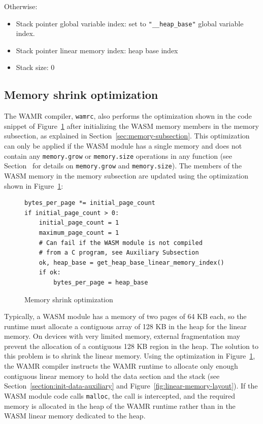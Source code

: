 \documentclass{article}
\begin{document}
Otherwise:

\begin{itemize}
\item Stack pointer global variable index: set to \verb|"__heap_base"| global variable index.
\item Stack pointer linear memory index: heap base index
\item Stack size: 0
\end{itemize}

\subsection{Memory shrink optimization}

The WAMR compiler, \verb|wamrc|, also performs the optimization shown in the code snippet of Figure~\ref{fig:memory-shrink-optimization} after initializing the WASM memory members in the memory subsection, as explained in Section~\ref{sec:memory-subsection}.
This optimization can only be applied if the WASM module has a single memory and does not contain any \verb|memory.grow| or \verb|memory.size| operations in any function (see Section~\cite[Sec.~2.4.4]{webassembly2019core} for details on \verb|memory.grow| and \verb|memory.size|).
The members of the WASM memory in the memory subsection are updated using the optimization shown in Figure~\ref{fig:memory-shrink-optimization}:

\begin{figure}[H]
\begin{verbatim}
bytes_per_page *= initial_page_count
if initial_page_count > 0:
    initial_page_count = 1
    maximum_page_count = 1
    # Can fail if the WASM module is not compiled
    # from a C program, see Auxiliary Subsection
    ok, heap_base = get_heap_base_linear_memory_index()
    if ok:
        bytes_per_page = heap_base
\end{verbatim}
\caption{Memory shrink optimization}
\label{fig:memory-shrink-optimization}
\end{figure}

Typically, a WASM module has a memory of two pages of 64 KB each, so the runtime must allocate a contiguous array of 128 KB in the heap for the linear memory.
On devices with very limited memory, external fragmentation may prevent the allocation of a contiguous 128 KB region in the heap.
The solution to this problem is to shrink the linear memory.
Using the optimization in Figure~\ref{fig:memory-shrink-optimization}, the WAMR compiler instructs the WAMR runtime to allocate only enough contiguous linear memory to hold the data section and the stack (see Section~\ref{section:init-data-auxiliary} and Figure~\ref{fig:linear-memory-layout}).
If the WASM module code calls \verb|malloc|, the call is intercepted, and the required memory is allocated in the heap of the WAMR runtime rather than in the WASM linear memory dedicated to the heap.
\end{document}
